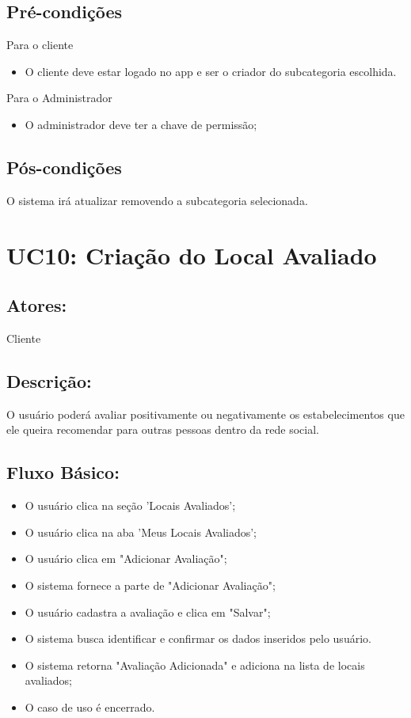 \subsection{Pré-condições}
Para o cliente
\begin{itemize}
    \item O cliente deve estar logado no app e ser o criador do subcategoria escolhida. 
\end{itemize}
Para o Administrador
\begin{itemize}
    \item O administrador deve ter a chave de permissão;
\end{itemize}
\subsection{Pós-condições}
O sistema irá atualizar removendo a subcategoria selecionada. 
\section{UC10: Criação do Local Avaliado}

\subsection{Atores:}
Cliente
\subsection{Descrição:}
O usuário poderá avaliar positivamente ou negativamente os estabelecimentos que ele queira recomendar para outras pessoas dentro da rede social. 
\subsection{Fluxo Básico:}

\begin{itemize}
    \item O usuário clica na seção 'Locais Avaliados';
    \item O usuário clica na aba 'Meus Locais Avaliados';
    \item O usuário clica em "Adicionar Avaliação";
    \item O sistema fornece a parte de "Adicionar Avaliação";
    \item O usuário cadastra a avaliação e clica em "Salvar";
    \item O sistema busca identificar e confirmar os dados inseridos pelo usuário.
    \item O sistema retorna "Avaliação Adicionada" e adiciona na lista de locais avaliados;
    \item O caso de uso é encerrado.
\end{itemize}
